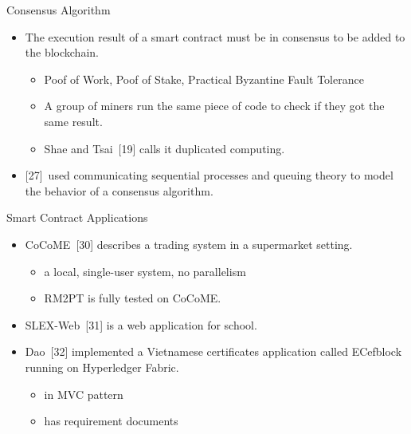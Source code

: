 \documentclass[xcolor=svgnames]{beamer}
\begin{document}
\begin{frame}[t]{Consensus Algorithm}
\begin{itemize}
\item The execution result of a smart contract must be in consensus to be added to the blockchain.


\begin{itemize}
\item<2-> Poof of Work, Poof of Stake, Practical Byzantine Fault Tolerance
\item<2-> A group of miners run the same piece of code to check if they got the same result.
\item<3-> Shae and Tsai~[19] calls it duplicated computing.
\end{itemize}

\item<3-> {[27]}~used communicating sequential processes and queuing theory to model the behavior of a consensus algorithm.
\end{itemize}

\end{frame}

\begin{frame}{Smart Contract Applications}
\begin{itemize}
\item CoCoME~[30] describes a trading system in a supermarket setting.
	\begin{itemize}
	\item a local, single-user system, no parallelism
	\item RM2PT is fully tested on CoCoME.
	\end{itemize}

\item SLEX-Web~[31] is a web application for school.
\item Dao~[32] implemented a Vietnamese certificates application called ECefblock running on Hyperledger Fabric.
	\begin{itemize}
	\item in MVC pattern
	\item has requirement documents
	\end{itemize}
\end{itemize}
\end{frame}
\end{document}
